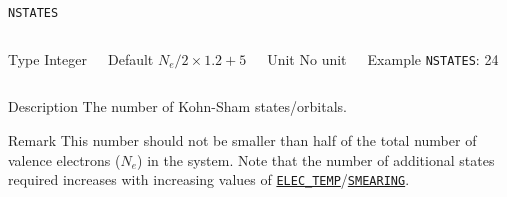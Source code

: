 \documentclass[xcolor=dvipsnames,t]{beamer}
\begin{document}
\begin{frame}[allowframebreaks]{\texttt{NSTATES}} \label{NSTATES}
\vspace*{-12pt}
\begin{columns}
\begin{block}{Type}
Integer
\end{block}

\begin{block}{Default}
$N_e/2 \times 1.2 + 5$
\end{block}

\begin{block}{Unit}
No unit
\end{block}

\begin{block}{Example}
\texttt{NSTATES}: 24
\end{block}
\end{columns}

\begin{block}{Description}
The number of Kohn-Sham states/orbitals.
\end{block}

\begin{block}{Remark}
This number should not be smaller than half of
the total number of valence electrons ($N_e$) in the system. Note that the number of additional states required increases with increasing values of \hyperlink{ELEC_TEMP}{\texttt{ELEC\_TEMP}}/\hyperlink{SMEARING}{\texttt{SMEARING}}.
\end{block}

\end{frame}
\end{document}
